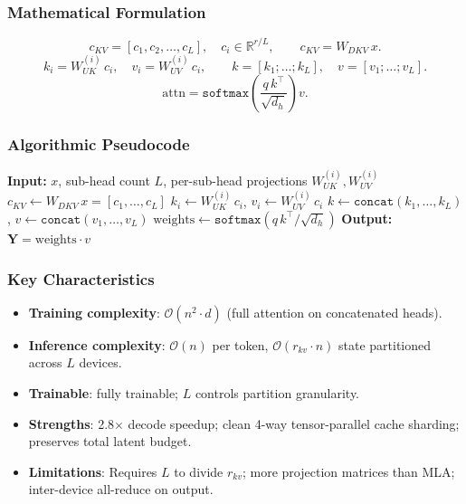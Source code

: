 \subsubsection{Mathematical Formulation}
\[
c_{KV} = [c_1, c_2, \ldots, c_L], \quad c_i \in \mathbb{R}^{r/L}, \qquad c_{KV} = W_{DKV}\, x.
\]
\[
k_i = W_{UK}^{(i)}\, c_i, \quad v_i = W_{UV}^{(i)}\, c_i, \qquad
k = [k_1; \ldots; k_L], \quad v = [v_1; \ldots; v_L].
\]
\[
\text{attn} = \texttt{softmax}\!\left(\frac{q\, k^\top}{\sqrt{d_h}}\right) v.
\]

\subsubsection{Algorithmic Pseudocode}
\begin{algorithmic}[1]
\State \textbf{Input:} $x$, sub-head count $L$, per-sub-head projections $W_{UK}^{(i)}, W_{UV}^{(i)}$
\State $c_{KV} \gets W_{DKV}\, x = [c_1, \ldots, c_L]$ 
    \State $k_i \gets W_{UK}^{(i)}\, c_i$, \quad $v_i \gets W_{UV}^{(i)}\, c_i$
\EndFor
\State $k \gets \texttt{concat}(k_1, \ldots, k_L)$, \quad $v \gets \texttt{concat}(v_1, \ldots, v_L)$
\State $\text{weights} \gets \texttt{softmax}(q\, k^\top / \sqrt{d_h})$
\State \textbf{Output:} $\mathbf{Y} = \text{weights} \cdot v$
\end{algorithmic}

\subsubsection{Key Characteristics}
\begin{itemize}[leftmargin=*]
    \item \textbf{Training complexity}: $\mathcal{O}(n^2 \cdot d)$ (full attention on concatenated heads).
    \item \textbf{Inference complexity}: $\mathcal{O}(n)$ per token, $\mathcal{O}(r_{kv} \cdot n)$ state partitioned across $L$ devices.
    \item \textbf{Trainable}: fully trainable; $L$ controls partition granularity.
    \item \textbf{Strengths}: 2.8$\times$ decode speedup; clean 4-way tensor-parallel cache sharding; preserves total latent budget.
    \item \textbf{Limitations}: Requires $L$ to divide $r_{kv}$; more projection matrices than MLA; inter-device all-reduce on output.
\end{itemize}

